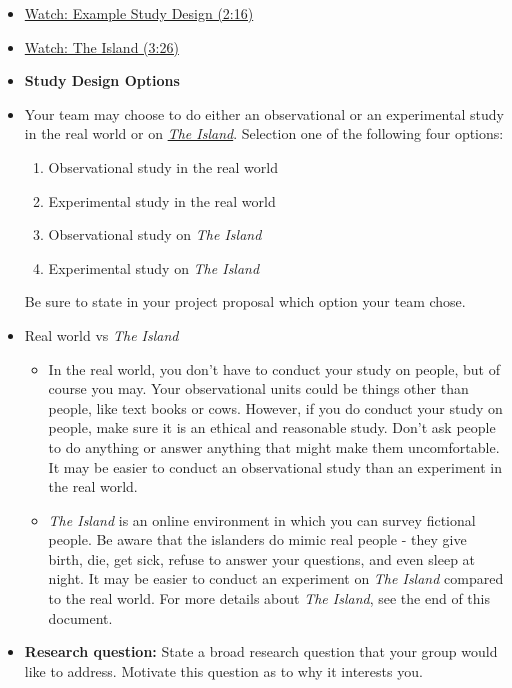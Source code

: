 \documentclass[letterpaper,12pt]{report}
\begin{document}
\begin{itemize}
    \item[] \href{https://youtu.be/YX_lKfmOd1E}{Watch: Example Study Design (2:16)}
        \item[] \href{https://youtu.be/2i2zfMqlR7Q}{Watch: The Island (3:26)}
    \item \textbf{Study Design Options}
    \item[] Your team may choose to do either an observational or an experimental study in the real world or on \href{http://island.maths.uq.edu.au/access.php?/index.php}{\emph{The Island}}.  Selection one of the following four options:
    \begin{enumerate}
    \item Observational study in the real world
    \item Experimental study in the real world
    \item Observational study on \emph{The Island}
    \item Experimental study on \emph{The Island}
    \end{enumerate}
    Be sure to state in your project proposal which option your team chose.
    \item[] Real world vs \emph{The Island}
    \begin{itemize}
    \item In the real world, you don't have to conduct your study on people, but of course you may.  Your observational units could be things other than people, like text books or cows.  However, if you do conduct your study on people, make sure it is an ethical and reasonable study.  Don't ask people to do anything or answer anything that might make them uncomfortable.  It may be easier to conduct an observational study than an experiment in the real world.
    \item \emph{The Island} is an online environment in which you can survey fictional people. Be aware that the islanders do mimic real people - they give birth, die, get sick, refuse to answer your questions, and even sleep at night.  It may be easier to conduct an experiment on \emph{The Island} compared to the real world.  For more details about \emph{The Island}, see the end of this document.
    \end{itemize}
    \item \textbf{Research question:} State a broad research question that your group would like to address.  Motivate this question as to why it interests you.

\end{itemize}
\end{document}
